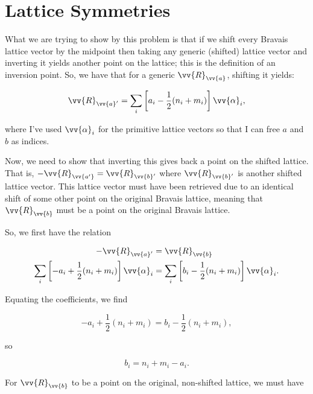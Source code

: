 \section{Lattice Symmetries}

\begin{parts}
\item What we are trying to show by this problem is that if we shift every Bravais lattice vector by the midpoint then taking any generic (shifted) lattice vector and inverting it yields another point on the lattice; this is the definition of an inversion point. So, we have that for a generic $\vv{R}_{\vv{a}}$, shifting it yields:

  \begin{equation}
    \vv{R}_{\vv{a}'} = \sum_i \left[ a_i - \frac{1}{2}(n_i + m_i)\right]\vv{\alpha}_i,
  \end{equation}

  where I've used $\vv{\alpha}_i$ for the primitive lattice vectors so that I can free $a$ and $b$ as indices.

  Now, we need to show that inverting this gives back a point on the shifted lattice. That is, $-\vv{R}_{\vv{a'}} = \vv{R}_{\vv{b}'}$ where $\vv{R}_{\vv{b}'}$ is another shifted lattice vector. This lattice vector must have been retrieved due to an identical shift of some other point on the original Bravais lattice, meaning that $\vv{R}_{\vv{b}}$ must be a point on the original Bravais lattice.

  So, we first have the relation

  \begin{align}
    -\vv{R}_{\vv{a}'} &= \vv{R}_{\vv{b}} \\
    \sum_i \left[ -a_i + \frac{1}{2}(n_i + m_i) \right]\vv{\alpha}_i &= \sum_i \left[ b_i - \frac{1}{2}(n_i + m_i) \right]\vv{\alpha}_i.
  \end{align}

  Equating the coefficients, we find

  \begin{equation}
    -a_i + \frac{1}{2}(n_i + m_i) = b_i - \frac{1}{2}(n_i + m_i),
  \end{equation}

  so

  \begin{equation}
    b_i = n_i + m_i - a_i.
  \end{equation}

  For $\vv{R}_{\vv{b}}$ to be a point on the original, non-shifted lattice, we must have


\end{parts}
